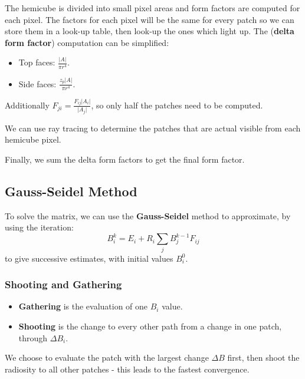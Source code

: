 \documentclass[11pt]{article}
\begin{document}
The hemicube is divided into small pixel areas and form factors are computed for each pixel.
The factors for each pixel will be the same for every patch so we can store them in a look-up table, then look-up the ones which light up.
The (\textbf{delta form factor}) computation can be simplified:
\begin{itemize}
  \item Top faces: $\frac{\lvert A \rvert}{\pi r^4}$.
  \item Side faces: $\frac{z_p \lvert A \rvert}{\pi r^4}$.
\end{itemize}
Additionally $F_{ji} = \frac{F_{ij}\lvert A_i \rvert}{\lvert A_j \rvert}$, so only half the patches need to be computed.

We can use ray tracing to determine the patches that are actual visible from each hemicube pixel.

Finally, we sum the delta form factors to get the final form factor.

\subsection{Gauss-Seidel Method}
To solve the matrix, we can use the \textbf{Gauss-Seidel} method to approximate, by using the iteration:
\[
  B_i^k = E_i + R_i \sum_j B_j^{k - 1}F_{ij} 
\]
to give successive estimates, with initial values $B_i^0$.

\subsubsection{Shooting and Gathering}
\begin{itemize}
  \item \textbf{Gathering} is the evaluation of one $B_i$ value.
  \item \textbf{Shooting} is the change to every other path from a change in one patch, through $\Delta B_i$.
\end{itemize}

We choose to evaluate the patch with the largest change $\Delta B$ first, then shoot the radiosity to all other patches - this leads to the fastest convergence.
\end{document}
